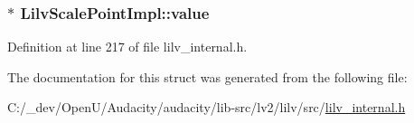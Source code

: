 \subsubsection[{\texorpdfstring{value}{value}}]{$\ast$ Lilv\+Scale\+Point\+Impl\+::value}\hypertarget{struct_lilv_scale_point_impl_ad35e6b3c176a538a376cfce7b88ac5d1}{}\label{struct_lilv_scale_point_impl_ad35e6b3c176a538a376cfce7b88ac5d1}


Definition at line 217 of file lilv\+\_\+internal.\+h.



The documentation for this struct was generated from the following file\+:\begin{DoxyCompactItemize}
\item 
C\+:/\+\_\+dev/\+Open\+U/\+Audacity/audacity/lib-\/src/lv2/lilv/src/\hyperlink{lilv__internal_8h}{lilv\+\_\+internal.\+h}\end{DoxyCompactItemize}
